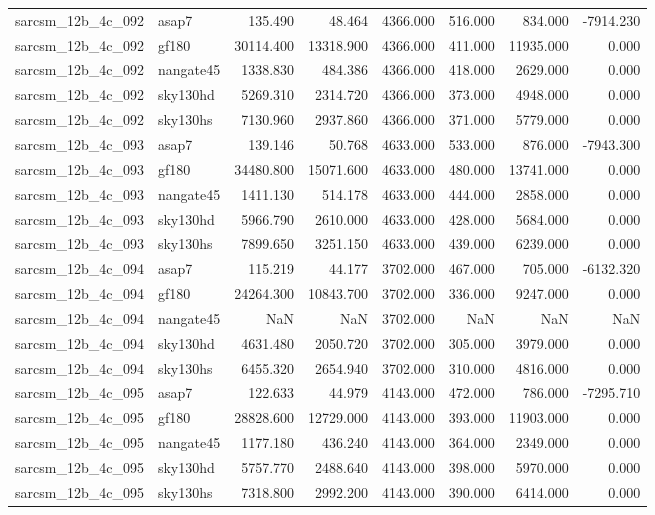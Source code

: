\begin{tabular}{llrrrrrr}
sarcsm\_12b\_4c\_092 & asap7 & 135.490 & 48.464 & 4366.000 & 516.000 & 834.000 & -7914.230 \\
sarcsm\_12b\_4c\_092 & gf180 & 30114.400 & 13318.900 & 4366.000 & 411.000 & 11935.000 & 0.000 \\
sarcsm\_12b\_4c\_092 & nangate45 & 1338.830 & 484.386 & 4366.000 & 418.000 & 2629.000 & 0.000 \\
sarcsm\_12b\_4c\_092 & sky130hd & 5269.310 & 2314.720 & 4366.000 & 373.000 & 4948.000 & 0.000 \\
sarcsm\_12b\_4c\_092 & sky130hs & 7130.960 & 2937.860 & 4366.000 & 371.000 & 5779.000 & 0.000 \\
sarcsm\_12b\_4c\_093 & asap7 & 139.146 & 50.768 & 4633.000 & 533.000 & 876.000 & -7943.300 \\
sarcsm\_12b\_4c\_093 & gf180 & 34480.800 & 15071.600 & 4633.000 & 480.000 & 13741.000 & 0.000 \\
sarcsm\_12b\_4c\_093 & nangate45 & 1411.130 & 514.178 & 4633.000 & 444.000 & 2858.000 & 0.000 \\
sarcsm\_12b\_4c\_093 & sky130hd & 5966.790 & 2610.000 & 4633.000 & 428.000 & 5684.000 & 0.000 \\
sarcsm\_12b\_4c\_093 & sky130hs & 7899.650 & 3251.150 & 4633.000 & 439.000 & 6239.000 & 0.000 \\
sarcsm\_12b\_4c\_094 & asap7 & 115.219 & 44.177 & 3702.000 & 467.000 & 705.000 & -6132.320 \\
sarcsm\_12b\_4c\_094 & gf180 & 24264.300 & 10843.700 & 3702.000 & 336.000 & 9247.000 & 0.000 \\
sarcsm\_12b\_4c\_094 & nangate45 & NaN & NaN & 3702.000 & NaN & NaN & NaN \\
sarcsm\_12b\_4c\_094 & sky130hd & 4631.480 & 2050.720 & 3702.000 & 305.000 & 3979.000 & 0.000 \\
sarcsm\_12b\_4c\_094 & sky130hs & 6455.320 & 2654.940 & 3702.000 & 310.000 & 4816.000 & 0.000 \\
sarcsm\_12b\_4c\_095 & asap7 & 122.633 & 44.979 & 4143.000 & 472.000 & 786.000 & -7295.710 \\
sarcsm\_12b\_4c\_095 & gf180 & 28828.600 & 12729.000 & 4143.000 & 393.000 & 11903.000 & 0.000 \\
sarcsm\_12b\_4c\_095 & nangate45 & 1177.180 & 436.240 & 4143.000 & 364.000 & 2349.000 & 0.000 \\
sarcsm\_12b\_4c\_095 & sky130hd & 5757.770 & 2488.640 & 4143.000 & 398.000 & 5970.000 & 0.000 \\
sarcsm\_12b\_4c\_095 & sky130hs & 7318.800 & 2992.200 & 4143.000 & 390.000 & 6414.000 & 0.000 \\

\end{tabular}
